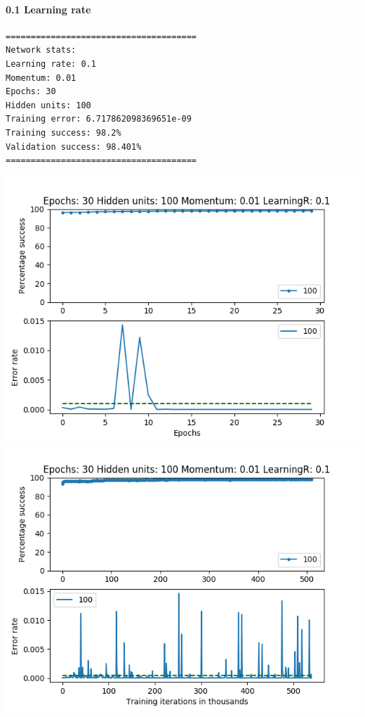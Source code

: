 \documentclass[11pt]{article}
\makeatletter
\def\maxwidth{\ifdim\Gin@nat@width>\linewidth\linewidth
    \else\Gin@nat@width\fi}
\let\Oldincludegraphics\includegraphics
\renewcommand{\includegraphics}[1]{\Oldincludegraphics[width=.8\maxwidth]{#1}}
\makeatother
\begin{document}
\hypertarget{learning-rate}{%
\paragraph{0.1 Learning rate}\label{learning-rate}}

\begin{verbatim}
======================================
Network stats: 
Learning rate: 0.1
Momentum: 0.01
Epochs: 30
Hidden units: 100
Training error: 6.717862098369651e-09
Training success: 98.2%
Validation success: 98.401%
======================================
\end{verbatim}

\includegraphics{Experiment1/E1_NN_Epoch_Momentum_0.01_30Epochs_100_LR_0.1_Hiddenunits.png}
\includegraphics{Experiment1/E1_NN_Training_Momentum_0.01_30Epochs_100_LR_0.1_Hiddenunits.png}
\end{document}
